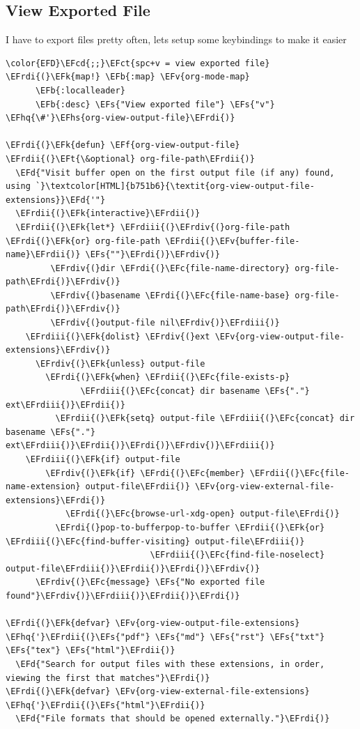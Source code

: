 \documentclass{scrartcl}
\newcommand{\EFk}[1]{\textcolor{EFk}{#1}} %
\newcommand{\EFd}[1]{\textcolor{EFd}{\textit{#1}}} %
\newcommand{\EFt}[1]{\textcolor{EFt}{#1}} %
\newcommand{\EFs}[1]{\textcolor{EFs}{#1}} %
\newcommand{\EFb}[1]{\textcolor{EFb}{#1}} %
\newcommand{\EFct}[1]{\textcolor{EFct}{#1}} %
\newcommand{\EFc}[1]{\textcolor{EFc}{#1}} %
\newcommand{\EFv}[1]{\textcolor{EFv}{#1}} %
\newcommand{\EFf}[1]{\textcolor{EFf}{#1}} %
\newcommand{\EFcd}[1]{\textcolor{EFcd}{#1}} %
\newcommand{\EFhq}[1]{\textcolor{EFhq}{#1}} %
\newcommand{\EFhs}[1]{\textcolor{EFhs}{#1}} %
\newcommand{\EFrdi}[1]{\textcolor{EFrdi}{#1}} %
\newcommand{\EFrdii}[1]{\textcolor{EFrdii}{#1}} %
\newcommand{\EFrdiii}[1]{\textcolor{EFrdiii}{#1}} %
\newcommand{\EFrdiv}[1]{\textcolor{EFrdiv}{#1}} %
\begin{document}
\subsection{View Exported File}
\label{sec:orgd3fe028}
I have to export files pretty often, lets setup some keybindings to make it easier
\begin{Code}
\begin{Verbatim}[]
\color{EFD}\EFcd{;;}\EFct{spc+v = view exported file}
\EFrdi{(}\EFk{map!} \EFb{:map} \EFv{org-mode-map}
      \EFb{:localleader}
      \EFb{:desc} \EFs{"View exported file"} \EFs{"v"} \EFhq{\#'}\EFhs{org-view-output-file}\EFrdi{)}

\EFrdi{(}\EFk{defun} \EFf{org-view-output-file} \EFrdii{(}\EFt{\&optional} org-file-path\EFrdii{)}
  \EFd{"Visit buffer open on the first output file (if any) found, using `}\textcolor[HTML]{b751b6}{\textit{org-view-output-file-extensions}}\EFd{'"}
  \EFrdii{(}\EFk{interactive}\EFrdii{)}
  \EFrdii{(}\EFk{let*} \EFrdiii{(}\EFrdiv{(}org-file-path \EFrdi{(}\EFk{or} org-file-path \EFrdii{(}\EFv{buffer-file-name}\EFrdii{)} \EFs{""}\EFrdi{)}\EFrdiv{)}
         \EFrdiv{(}dir \EFrdi{(}\EFc{file-name-directory} org-file-path\EFrdi{)}\EFrdiv{)}
         \EFrdiv{(}basename \EFrdi{(}\EFc{file-name-base} org-file-path\EFrdi{)}\EFrdiv{)}
         \EFrdiv{(}output-file nil\EFrdiv{)}\EFrdiii{)}
    \EFrdiii{(}\EFk{dolist} \EFrdiv{(}ext \EFv{org-view-output-file-extensions}\EFrdiv{)}
      \EFrdiv{(}\EFk{unless} output-file
        \EFrdi{(}\EFk{when} \EFrdii{(}\EFc{file-exists-p}
               \EFrdiii{(}\EFc{concat} dir basename \EFs{"."} ext\EFrdiii{)}\EFrdii{)}
          \EFrdii{(}\EFk{setq} output-file \EFrdiii{(}\EFc{concat} dir basename \EFs{"."} ext\EFrdiii{)}\EFrdii{)}\EFrdi{)}\EFrdiv{)}\EFrdiii{)}
    \EFrdiii{(}\EFk{if} output-file
        \EFrdiv{(}\EFk{if} \EFrdi{(}\EFc{member} \EFrdii{(}\EFc{file-name-extension} output-file\EFrdii{)} \EFv{org-view-external-file-extensions}\EFrdi{)}
            \EFrdi{(}\EFc{browse-url-xdg-open} output-file\EFrdi{)}
          \EFrdi{(}pop-to-bufferpop-to-buffer \EFrdii{(}\EFk{or} \EFrdiii{(}\EFc{find-buffer-visiting} output-file\EFrdiii{)}
                             \EFrdiii{(}\EFc{find-file-noselect} output-file\EFrdiii{)}\EFrdii{)}\EFrdi{)}\EFrdiv{)}
      \EFrdiv{(}\EFc{message} \EFs{"No exported file found"}\EFrdiv{)}\EFrdiii{)}\EFrdii{)}\EFrdi{)}

\EFrdi{(}\EFk{defvar} \EFv{org-view-output-file-extensions} \EFhq{'}\EFrdii{(}\EFs{"pdf"} \EFs{"md"} \EFs{"rst"} \EFs{"txt"} \EFs{"tex"} \EFs{"html"}\EFrdii{)}
  \EFd{"Search for output files with these extensions, in order, viewing the first that matches"}\EFrdi{)}
\EFrdi{(}\EFk{defvar} \EFv{org-view-external-file-extensions} \EFhq{'}\EFrdii{(}\EFs{"html"}\EFrdii{)}
  \EFd{"File formats that should be opened externally."}\EFrdi{)}
\end{Verbatim}
\end{Code}
\end{document}
